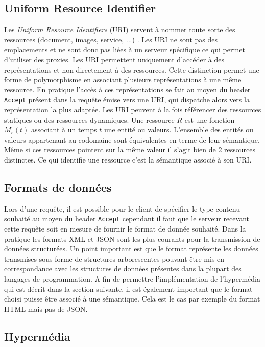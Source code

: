 \documentclass[a4paper, 11pt]{report}
\begin{document}
\subsection{Uniform Resource Identifier}

Les \emph{Uniform Resource Identifiers} (URI) servent à nommer toute
sorte des ressources (document, images, service, ...)
\cite{masinter2005uniform}. Les URI ne sont pas des emplacements et
ne sont donc pas liées à un serveur spécifique ce qui permet
d'utiliser des proxies. Les URI permettent uniquement d'accéder à des
représentations et non directement à des ressources. Cette
distinction permet une forme de polymorphisme en associant plusieurs
représentations à une même ressource. En pratique l'accès à ces
représentations se fait au moyen du header \verb=Accept= présent dans
la requête émise vers une URI, qui dispatche alors vers la
représentation la plus adaptée. Les URI peuvent à la fois référencer
des ressources statiques ou des ressources dynamiques. Une ressource
$R$ est une fonction $M_r(t)$ associant à un temps $t$ une entité ou
valeurs. L'ensemble des entités ou valeurs appartenant au codomaine
sont équivalentes en terme de leur sémantique. Même si ces ressources
pointent sur la même valeur il s'agit bien de 2 ressources distinctes.
Ce qui identifie une ressource c'est la sémantique associé à son URI.

\subsection{Formats de données}

Lors d'une requête, il est possible pour le client de spécifier le
type contenu souhaité au moyen du header \verb=Accept= cependant il
faut que le serveur recevant cette requête soit en mesure de fournir
le format de donnée souhaité. Dans la pratique les formats XML et
JSON sont les plus courants pour la transmission de données
structurées. Un point important est que le format représente les
données transmises sous forme de structures arborescentes pouvant être
mis en correspondance avec les structures de données présentes dans la
plupart des langages de programmation. A fin de permettre
l'implémentation de l'hypermédia qui est décrit dans la section
suivante, il est également important que le format choisi puisse être
associé à une sémantique. Cela est le cas par exemple du format HTML
mais pas de JSON.

\subsection{Hypermédia}
\end{document}
